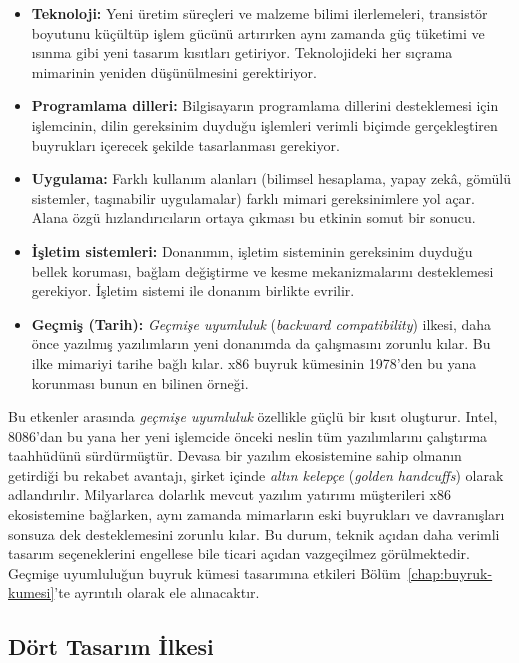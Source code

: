 \begin{itemize}
    \item \textbf{Teknoloji:} Yeni üretim süreçleri ve malzeme bilimi ilerlemeleri, transistör boyutunu küçültüp işlem gücünü artırırken aynı zamanda güç tüketimi ve ısınma gibi yeni tasarım kısıtları getiriyor. Teknolojideki her sıçrama mimarinin yeniden düşünülmesini gerektiriyor.
    \item \textbf{Programlama dilleri:} Bilgisayarın programlama dillerini desteklemesi için işlemcinin, dilin gereksinim duyduğu işlemleri verimli biçimde gerçekleştiren buyrukları içerecek şekilde tasarlanması gerekiyor.
    \item \textbf{Uygulama:} Farklı kullanım alanları (bilimsel hesaplama, yapay zekâ, gömülü sistemler, taşınabilir uygulamalar) farklı mimari gereksinimlere yol açar. Alana özgü hızlandırıcıların ortaya çıkması bu etkinin somut bir sonucu.
    \item \textbf{İşletim sistemleri:} Donanımın, işletim sisteminin gereksinim duyduğu bellek koruması, bağlam değiştirme ve kesme mekanizmalarını desteklemesi gerekiyor. İşletim sistemi ile donanım birlikte evrilir.
    \item \textbf{Geçmiş (Tarih):} \emph{Geçmişe uyumluluk} (\emph{backward compatibility}) ilkesi, daha önce yazılmış yazılımların yeni donanımda da çalışmasını zorunlu kılar. Bu ilke mimariyi tarihe bağlı kılar. x86 buyruk kümesinin 1978'den bu yana korunması bunun en bilinen örneği.
\end{itemize}

Bu etkenler arasında \emph{geçmişe uyumluluk} özellikle güçlü bir kısıt oluşturur. Intel, 8086'dan bu yana her yeni işlemcide önceki neslin tüm yazılımlarını çalıştırma taahhüdünü sürdürmüştür. Devasa bir yazılım ekosistemine sahip olmanın getirdiği bu rekabet avantajı, şirket içinde \emph{altın kelepçe} (\emph{golden handcuffs}) olarak adlandırılır. Milyarlarca dolarlık mevcut yazılım yatırımı müşterileri x86 ekosistemine bağlarken, aynı zamanda mimarların eski buyrukları ve davranışları sonsuza dek desteklemesini zorunlu kılar. Bu durum, teknik açıdan daha verimli tasarım seçeneklerini engellese bile ticari açıdan vazgeçilmez görülmektedir. Geçmişe uyumluluğun buyruk kümesi tasarımına etkileri Bölüm~\ref{chap:buyruk-kumesi}'te ayrıntılı olarak ele alınacaktır.

\subsection{Dört Tasarım İlkesi}
\label{sec:tasarim-ilkeleri}


